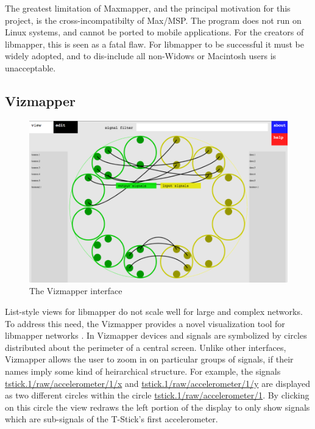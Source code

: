 The greatest limitation of Maxmapper, and the principal motivation for this project, is the cross-incompatibilty of Max/MSP. The program does not run on Linux systems, and cannot be ported to mobile applications. For the creators of libmapper, this is seen as a fatal flaw. For libmapper to be successful it must be widely adopted, and to dis-include all non-Widows or Macintosh users is unacceptable.

	\subsection{Vizmapper} %
	\label{sub:vizmapper}

\begin{figure}[h]
	\centering
	\includegraphics[width=\textwidth]{figures/vizmapper2}
	\caption{The Vizmapper interface}
	\label{fig:vizmapper}
\end{figure}

List-style views for libmapper do not scale well for large and complex networks. To address this need, the Vizmapper provides a novel visualization tool for libmapper networks \cite{vizmapper}. In Vizmapper devices and signals are symbolized by circles distributed about the perimeter of a central screen. Unlike other interfaces, Vizmapper allows the user to zoom in on particular groups of signals, if their names imply some kind of heirarchical structure. For example, the signals \url{tstick.1/raw/accelerometer/1/x} and \url{tstick.1/raw/accelerometer/1/y} are displayed as two different circles within the circle \url{tstick.1/raw/accelerometer/1}. By clicking on this circle the view redraws the left portion of the display to only show signals which are sub-signals of the T-Stick's first accelerometer. 

